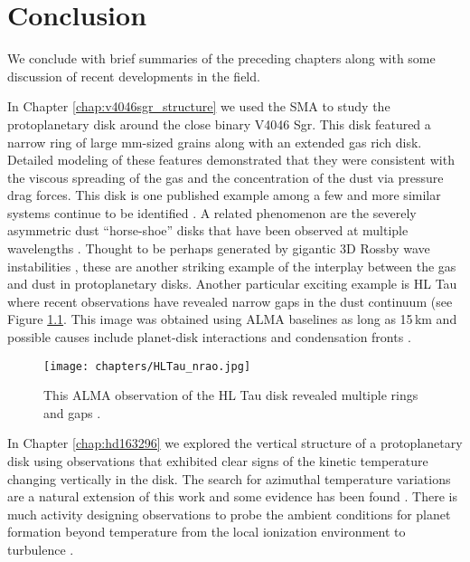\chapter{Conclusion} \label{chap:conclusion}

We conclude with brief summaries of the preceding chapters along with some discussion of recent developments 
in the field.

In Chapter \ref{chap:v4046sgr_structure} we 
used the SMA to study the protoplanetary disk 
around the close binary V4046 Sgr.  This disk featured a narrow ring of large mm-sized grains along with
an extended gas rich disk.  Detailed modeling of these features demonstrated that they were 
consistent with the viscous spreading of the gas and the concentration of the dust via pressure 
drag forces.  This disk is one published example among a few and more similar systems continue to be
identified \citep{isella07,panic09,andrews12,degregorio-monsalvo13,zhang14}.  A related phenomenon are the 
severely asymmetric dust  ``horse-shoe'' disks that have been observed at multiple wavelengths
\citep{vandermarel13,fukagawa13,isella13,casassus15,marino15}.  Thought to be perhaps generated by gigantic 
3D Rossby wave instabilities \citep{regaly12}, these are another striking example of the interplay between
the gas and dust in protoplanetary disks.  Another particular exciting example is HL Tau where recent
observations have revealed narrow gaps in the dust 
continuum (see Figure \ref{fig:hltau}. This image was obtained using ALMA baselines as long as 15\,km 
and possible causes include
planet-disk interactions and condensation fronts \citep{brogan15,zhang15}.

\begin{figure}
\centering
\texttt{[image: chapters/HLTau\_nrao.jpg]}
\caption{This ALMA observation of the HL Tau disk revealed multiple rings and gaps \citep{brogan15}.}
\label{fig:hltau}
\end{figure}

In Chapter \ref{chap:hd163296} we explored the vertical structure of a protoplanetary disk using 
observations that exhibited clear signs of the kinetic temperature changing vertically in the disk.
The search for azimuthal temperature variations are a natural extension of this work \citep{isella13} and 
some evidence has been found \citep{vanderplas14}.  There is much activity designing 
observations to probe the ambient conditions 
for planet formation beyond temperature from the local ionization environment \citep{cleeves14,teague15} to 
turbulence \citep{hughes11,guilloteau12,flock15,simon15}.

